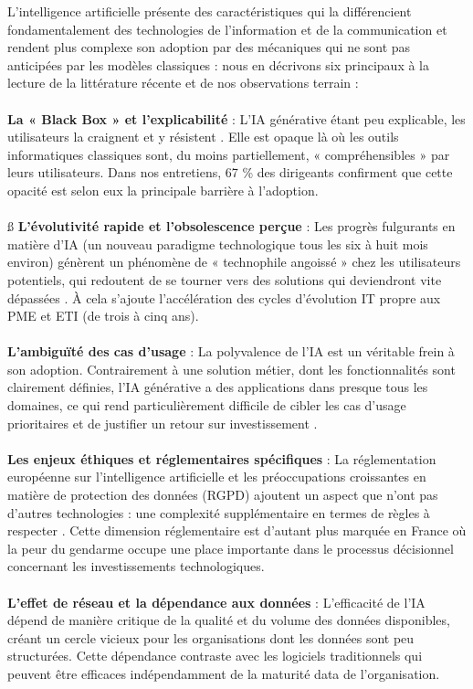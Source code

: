 L’intelligence artificielle présente des caractéristiques qui la différencient fondamentalement des technologies de l’information et de la communication et rendent plus complexe son adoption par des mécaniques qui ne sont pas anticipées par les modèles classiques : nous en décrivons six principaux à la lecture de la littérature récente et de nos observations terrain :
\\\\
\textbf{La « Black Box » et l'explicabilité} : L'IA générative étant peu explicable, les utilisateurs la craignent et y résistent \cite{fountaine2019building}. Elle est opaque là où les outils informatiques classiques sont, du moins partiellement, « compréhensibles » par leurs utilisateurs. Dans nos entretiens, 67 \% des dirigeants confirment que cette opacité est selon eux la principale barrière à l'adoption.
\\\\ß
\textbf{L'évolutivité rapide et l'obsolescence perçue} : Les progrès fulgurants en matière d'IA (un nouveau paradigme technologique tous les six à huit mois environ) génèrent un phénomène de « technophile angoissé » chez les utilisateurs potentiels, qui redoutent de se tourner vers des solutions qui deviendront vite dépassées \cite{ransbotham2023expanding}. À cela s'ajoute l'accélération des cycles d'évolution IT propre aux PME et ETI (de trois à cinq ans).
\\\\
\textbf{L'ambiguïté des cas d'usage} : La polyvalence de l'IA est un véritable frein à son adoption. Contrairement à une solution métier, dont les fonctionnalités sont clairement définies, l'IA générative a des applications dans presque tous les domaines, ce qui rend particulièrement difficile de cibler les cas d'usage prioritaires et de justifier un retour sur investissement \cite{dwivedi2021artificial}.
\\\\
\textbf{Les enjeux éthiques et réglementaires spécifiques} : La réglementation européenne sur l'intelligence artificielle et les préoccupations croissantes en matière de protection des données (RGPD) ajoutent un aspect que n'ont pas d'autres technologies : une complexité supplémentaire en termes de règles à respecter \cite{bertolucci2024artificial}. Cette dimension réglementaire est d'autant plus marquée en France où la peur du gendarme occupe une place importante dans le processus décisionnel concernant les investissements technologiques.
\\\\
\textbf{L'effet de réseau et la dépendance aux données} : L'efficacité de l'IA dépend de manière critique de la qualité et du volume des données disponibles, créant un cercle vicieux pour les organisations dont les données sont peu structurées. Cette dépendance contraste avec les logiciels traditionnels qui peuvent être efficaces indépendamment de la maturité data de l'organisation.

